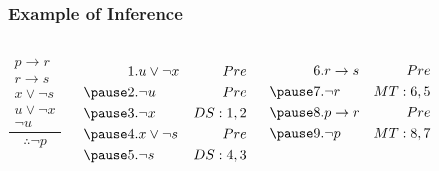 \documentclass[dvipsnames]{beamer}
\begin{document}
\begin{frame}
  \frametitle{Example of Inference}

  \begin{example}
    \begin{columns}[t]
      \[
      \frac
        {
          \begin{array}{c}
            p \rightarrow r\\
            r \rightarrow s\\
            x \vee \neg s\\
            u \vee \neg x\\
            \neg u
          \end{array}
        }
        {
          \therefore \neg p
        }
      \]

      \pause
      \begin{eqnarray*}
        1. & u \vee \neg x   & Pre\\
        \pause
        2. & \neg u          & Pre\\
        \pause
        3. & \neg x          & DS:1,2\\
        \pause
        4. & x \vee \neg s   & Pre\\
        \pause
        5. & \neg s          & DS:4,3\\
      \end{eqnarray*}

      \pause
      \begin{eqnarray*}
        6. & r \rightarrow s & Pre\\
        \pause
        7. & \neg r          & MT:6,5\\
        \pause
        8. & p \rightarrow r & Pre\\
        \pause
        9. & \neg p          & MT:8,7\\
      \end{eqnarray*}
    \end{columns}
  \end{example}
\end{frame}
\end{document}
